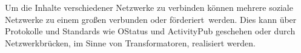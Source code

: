 	Um die Inhalte verschiedener Netzwerke zu verbinden können mehrere soziale Netzwerke zu einem großen verbunden oder \glqq förderiert\grqq~werden. Dies kann über Protokolle und Standards wie OStatus und ActivityPub geschehen oder durch Netzwerkbrücken, im Sinne von Transformatoren, realisiert werden.
	\subsection{
	}
\section{
}
